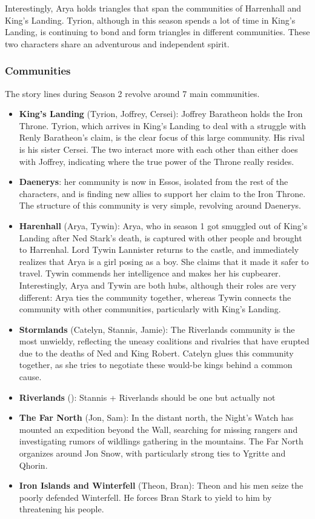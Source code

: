 \documentclass[10pt,twocolumn,letterpaper]{article}
\begin{document}
Interestingly, Arya holds triangles that span the communities of Harrenhall and King's Landing. Tyrion, although in this season spends a lot of time in King's Landing, is continuing to bond and form triangles in different communities. These two characters share an adventurous and independent spirit.


\subsubsection{Communities}

The story lines during Season 2 revolve around 7 main communities. 

\begin{itemize}
    \item \textbf{King's Landing} (Tyrion, Joffrey, Cersei): Joffrey Baratheon holds the Iron Throne. Tyrion, which arrives in King's Landing to deal with a struggle with Renly Baratheon's claim, is the clear focus of this large community. His rival is his sister Cersei. The two interact more with each other than either does with Joffrey, indicating where the true power of the Throne really resides.
    \item \textbf{Daenerys}: her community is now in Essos, isolated from the rest of the characters, and is finding new allies to support her claim to the Iron Throne. The structure of this community is very simple, revolving around Daenerys.
    \item \textbf{Harenhall} (Arya, Tywin): Arya, who in season 1 got smuggled out of King's Landing after Ned Stark's death, is captured with other people and brought to Harrenhal. Lord Tywin Lannister returns to the castle, and immediately realizes that Arya is a girl posing as a boy. She claims that it made it safer to travel. Tywin commends her intelligence and makes her his cupbearer. 
    Interestingly, Arya and Tywin are both hubs, although their roles are very different: Arya ties the community together, whereas Tywin connects the community with other communities, particularly with King's Landing.
    \item  \textbf{Stormlands} (Catelyn, Stannis, Jamie): The Riverlands community is the most unwieldy, reflecting the uneasy coalitions and rivalries that have erupted due to the deaths of Ned and King Robert. Catelyn glues this community together, as she tries to negotiate these would-be kings behind a common cause.
    \item  \textbf{Riverlands} (): Stannis + Riverlands should be one but actually not
    \item  \textbf{The Far North} (Jon, Sam):  In the distant north, the Night's Watch has mounted an expedition beyond the Wall, searching for missing rangers and investigating rumors of wildlings gathering in the mountains. The Far North organizes around Jon Snow, with particularly strong ties to Ygritte and Qhorin.
    \item  \textbf{Iron Islands and Winterfell} (Theon, Bran): Theon and his men seize the poorly defended Winterfell. He forces Bran Stark to yield to him by threatening his people. 
    
\end{itemize}
\end{document}
